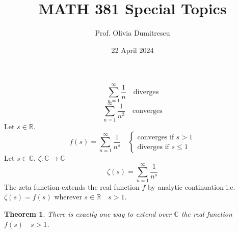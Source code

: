 \documentclass[letterpaper, 12pt]{article}
\title{MATH 381 Special Topics}
\author{Prof. Olivia Dumitrescu}
\date{22 April 2024}
\newtheorem{theorem}{Theorem}[section]
\newcommand{\R}{\mathbb{R}}
\newcommand{\C}{\mathbb{C}}
\newcommand{\0}{\emptyset}
\begin{document}
    \maketitle
    \[\sum_{n=1}^{\infty} \frac{1}{n} \quad \text{diverges}\]
    \[\sum_{n=1}^{\infty} \frac{1}{n^2} \quad \text{converges}\]
    Let $s \in \R$.
    \[f(s) = \sum_{n=1}^{\infty} \frac{1}{n^s} \quad \begin{cases*}
        \text{converges if } s > 1 \\
        \text{diverges if } s \le 1
    \end{cases*}\]
    Let $s \in \C$. $\zeta : \C \to \C$
    \[\zeta(s) = \sum_{n=1}^{\infty} \frac{1}{n^s}\]
    The zeta function extends the real function $f$ by analytic continuation 
    i.e. $\zeta(s) = f(s)$ wherever $s \in \R \quad s > 1$.
    \begin{theorem}
        There is exactly one way to extend over $\C$ the real function $f(s) \quad s > 1$.
    \end{theorem}
\end{document}
